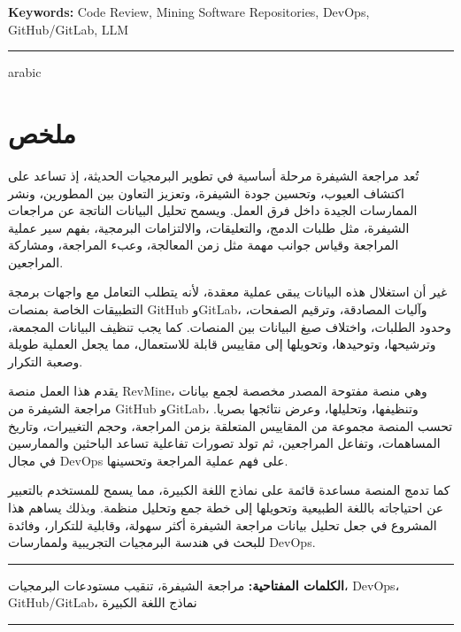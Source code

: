 \noindent\textbf{Keywords:} Code Review, Mining Software Repositories, DevOps, GitHub/GitLab, LLM

\noindent\rule[2pt]{\textwidth}{0.9pt}

\clearpage

\begin{otherlanguage*}{arabic}
\section*{ملخص}

تُعد مراجعة الشيفرة مرحلة أساسية في تطوير البرمجيات الحديثة، إذ تساعد على اكتشاف العيوب، وتحسين جودة الشيفرة، وتعزيز التعاون بين المطورين، ونشر الممارسات الجيدة داخل فرق العمل. ويسمح تحليل البيانات الناتجة عن مراجعات الشيفرة، مثل طلبات الدمج، والتعليقات، والالتزامات البرمجية، بفهم سير عملية المراجعة وقياس جوانب مهمة مثل زمن المعالجة، وعبء المراجعة، ومشاركة المراجعين.

غير أن استغلال هذه البيانات يبقى عملية معقدة، لأنه يتطلب التعامل مع واجهات برمجة التطبيقات الخاصة بمنصات GitHub وGitLab، وآليات المصادقة، وترقيم الصفحات، وحدود الطلبات، واختلاف صيغ البيانات بين المنصات. كما يجب تنظيف البيانات المجمعة، وترشيحها، وتوحيدها، وتحويلها إلى مقاييس قابلة للاستعمال، مما يجعل العملية طويلة وصعبة التكرار.

يقدم هذا العمل منصة RevMine، وهي منصة مفتوحة المصدر مخصصة لجمع بيانات مراجعة الشيفرة من GitHub وGitLab، وتنظيفها، وتحليلها، وعرض نتائجها بصريا. تحسب المنصة مجموعة من المقاييس المتعلقة بزمن المراجعة، وحجم التغييرات، وتاريخ المساهمات، وتفاعل المراجعين، ثم تولد تصورات تفاعلية تساعد الباحثين والممارسين في مجال DevOps على فهم عملية المراجعة وتحسينها.

كما تدمج المنصة مساعدة قائمة على نماذج اللغة الكبيرة، مما يسمح للمستخدم بالتعبير عن احتياجاته باللغة الطبيعية وتحويلها إلى خطة جمع وتحليل منظمة. وبذلك يساهم هذا المشروع في جعل تحليل بيانات مراجعة الشيفرة أكثر سهولة، وقابلية للتكرار، وفائدة للبحث في هندسة البرمجيات التجريبية ولممارسات DevOps.

\vspace{1em}
\noindent\rule[2pt]{\textwidth}{0.5pt}

\noindent\textbf{الكلمات المفتاحية:} مراجعة الشيفرة، تنقيب مستودعات البرمجيات، DevOps، GitHub/GitLab، نماذج اللغة الكبيرة

\noindent\rule[2pt]{\textwidth}{0.9pt}
\end{otherlanguage*}

\clearpage
